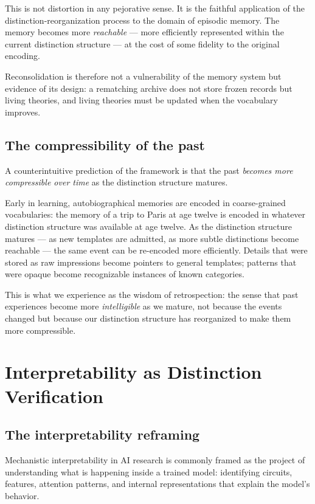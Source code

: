 \documentclass[11pt, a4paper]{article}
\theoremstyle{plain}
\theoremstyle{definition}
\theoremstyle{remark}
\begin{document}
This is not distortion in any pejorative sense. It is the
faithful application of the distinction-reorganization process
to the domain of episodic memory. The memory becomes more
\emph{reachable} --- more efficiently represented within the
current distinction structure --- at the cost of some fidelity
to the original encoding.

Reconsolidation is therefore not a vulnerability of the memory
system but evidence of its design: a rematching archive does not
store frozen records but living theories, and living theories
must be updated when the vocabulary improves.

\subsection{The compressibility of the past}

A counterintuitive prediction of the framework is that the past
\emph{becomes more compressible over time} as the distinction
structure matures.

Early in learning, autobiographical memories are encoded in
coarse-grained vocabularies: the memory of a trip to Paris at
age twelve is encoded in whatever distinction structure was
available at age twelve. As the distinction structure matures
--- as new templates are admitted, as more subtle distinctions
become reachable --- the same event can be re-encoded more
efficiently. Details that were stored as raw impressions become
pointers to general templates; patterns that were opaque become
recognizable instances of known categories.

This is what we experience as the wisdom of retrospection:
the sense that past experiences become more \emph{intelligible}
as we mature, not because the events changed but because our
distinction structure has reorganized to make them more compressible.

\section{Interpretability as Distinction Verification}
\label{sec:ai}

\subsection{The interpretability reframing}

Mechanistic interpretability in AI research is commonly framed
as the project of understanding what is happening inside a
trained model: identifying circuits, features, attention patterns,
and internal representations that explain the model's behavior.
\end{document}
